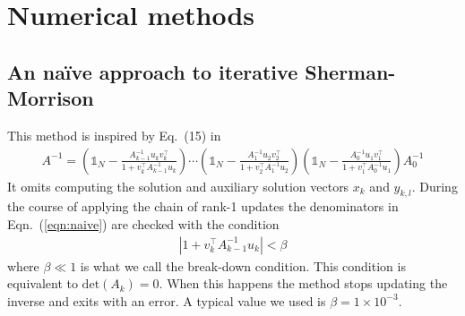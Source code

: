 \documentclass[11pt]{article}
\numberwithin{figure}{section}
\numberwithin{table}{section}
\begin{document}
%			
%			

		
		\section{Numerical methods}\label{sec:num_opt}
		
			\subsection{An na\"{i}ve approach to iterative Sherman-Morrison}\label{sec:naive}
				This method is inspired by Eq.~(15) in \cite{MAPONI2007276}
				\begin{align}\label{eqn:naive}
					A^{-1} =
		\left(\mathbb{1}_N-\frac{A_{k-1}^{-1}u_kv_k^\top}{1+v_k^\top A_{k-1}^{-1}u_k}\right)
		\cdots
		\left(\mathbb{1}_N-\frac{A_1^{-1}u_2v_2^\top }{1+v_2^\top A_1^{-1}u_2}\right)
		\left(\mathbb{1}_N-\frac{A_0^{-1}u_1v_1^\top }{1+v_1^\top A_0^{-1}u_1}\right)
		A_0^{-1}
				\end{align}
				It omits computing the solution and auxiliary solution vectors $x_k$ and $y_{k,l}$. During the course of applying the chain of rank-1 updates the denominators in Eqn.~(\ref{eqn:naive}) are checked with the condition
				\begin{align}\label{cond:break-down}
					\left|1+v_k^\top A_{k-1}^{-1}u_k\right| < \beta
				\end{align}
				where $\beta\ll1$ is what we call the break-down condition. This condition is equivalent to $\mathrm{det}(A_k)=0$. When this happens the method stops updating the inverse and exits with an error. A typical value we used is $\beta=1\times10^{-3}$.\\
				
\end{document}
